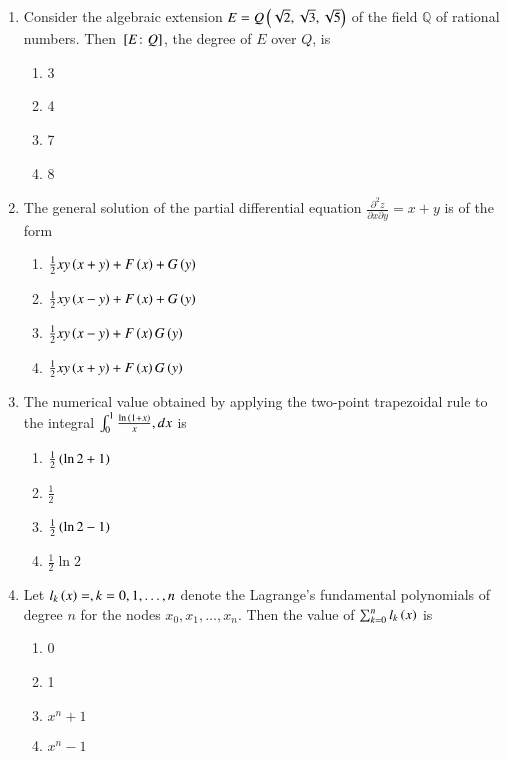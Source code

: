 \documentclass[journal]{IEEEtran}
\begin{document}
\begin{enumerate}
\item Consider the algebraic extension $E = Q \left(\sqrt{2}, \sqrt{3}, \sqrt{5}\right)$ of the field $\mathbb{Q}$ of rational numbers. Then ${}\left[E \colon Q\right]$, the degree of $E$ over $Q$, is
\begin{multicols}{2}
    \begin{enumerate}
        \item 3
        \item 4
        \item 7
        \item 8
    \end{enumerate}
\end{multicols}

\item The general solution of the partial differential equation $\frac{\partial^2 z}{\partial x \partial y} = x + y$ is of the form
\begin{multicols}{2}
    \begin{enumerate}
        \item $\frac{1}{2} xy \left(x+y\right) + F\left(x\right) + G\left(y\right)$
        \item $\frac{1}{2} xy \left(x-y\right) + F\left(x\right) + G\left(y\right)$
        \item $\frac{1}{2} xy \left(x-y\right) + F\left(x\right) G\left(y\right)$
        \item $\frac{1}{2} xy \left(x+y\right) + F\left(x\right) G\left(y\right)$
    \end{enumerate}
\end{multicols}

\item The numerical value obtained by applying the two-point trapezoidal rule to the integral $\int_0^1 \frac{\ln{\ensuremath{\left(1+x\right)}}}{x}, dx$ is
\begin{multicols}{2}
    \begin{enumerate}
        \item $\frac{1}{2} \left(\ln{2}+1\right)$
        \item $\frac{1}{2}$
        \item $\frac{1}{2} \left(\ln{2}-1\right)$
        \item $\frac{1}{2} \ln{2}$
    \end{enumerate}
\end{multicols}

\item Let $l_k \left(x\right) =, k =0,1, \dots , n$ denote the Lagrange's fundamental polynomials of degree $n$ for the nodes $x_0, x_1, \dots , x_n$. Then the value of $\sum_{k=0}^{n} l_k \left(x\right)$ is
    \begin{enumerate}
        \item 0
        \item 1
        \item $x^n + 1$
        \item $x^n - 1$
    \end{enumerate}


\end{enumerate}
\end{document}
